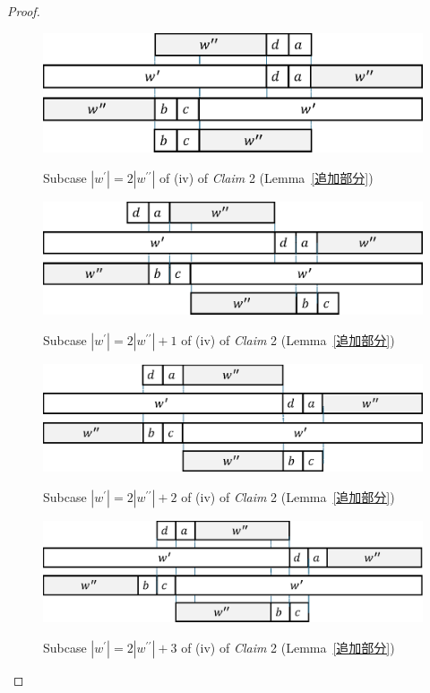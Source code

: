 \begin{proof}
\begin{figure}[t]
  \begin{center}
    \includegraphics[scale=0.45]{figs/w=2w_1.eps}
    \caption{Subcase $|w^{\prime}| = 2|w^{\prime\prime}|$ of (iv) of \textit{Claim} 2 (Lemma~\ref{追加部分})}\label{追加部分14}
    \bigskip
    \includegraphics[scale=0.45]{figs/w=2w_1+1.eps}
    \caption{Subcase $|w^{\prime}| = 2|w^{\prime\prime}| + 1$ of (iv) of \textit{Claim} 2 (Lemma~\ref{追加部分})}\label{追加部分13}
    \bigskip
    \includegraphics[scale=0.45]{figs/w=2w_1+2.eps}
    \caption{Subcase $|w^{\prime}| = 2|w^{\prime\prime}| + 2$ of (iv) of \textit{Claim} 2 (Lemma~\ref{追加部分})}\label{追加部分12}
    \bigskip
    \includegraphics[scale=0.45]{figs/w=2w_1+3.eps}
    \caption{Subcase $|w^{\prime}| = 2|w^{\prime\prime}| + 3$ of (iv) of \textit{Claim} 2 (Lemma~\ref{追加部分})}\label{追加部分11}
  \end{center}
\end{figure}


\end{proof}
